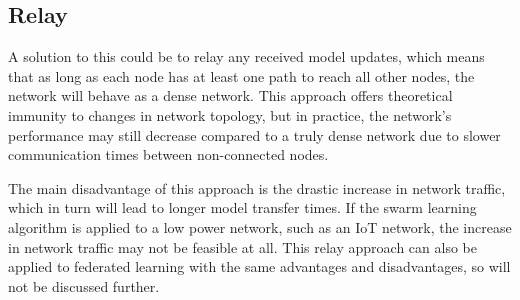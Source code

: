 \subsection{Relay} \label{relay}
A solution to this could be to relay any received model updates, which means that as long as each node has at least one path to reach all other nodes, the network will behave as a dense network. This approach offers theoretical immunity to changes in network topology, but in practice, the network's performance may still decrease compared to a truly dense network due to slower communication times between non-connected nodes.

The main disadvantage of this approach is the drastic increase in network traffic, which in turn will lead to longer model transfer times. If the swarm learning algorithm is applied to a low power network, such as an IoT network, the increase in network traffic may not be feasible at all. This relay approach can also be applied to federated learning with the same advantages and disadvantages, so will not be discussed further.